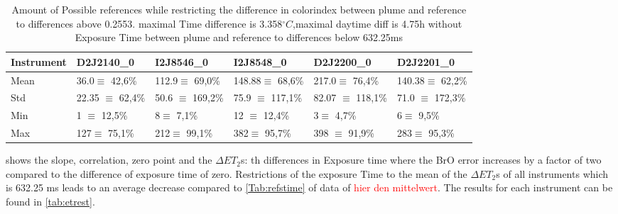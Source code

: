 \begin{table}
	\begin{tabular}{|p{2cm}|p{2cm}|p{2cm}|p{2cm}|p{2cm}|p{2cm}|}
		Instrument	&D2J2140\_0&I2J8546\_0& I2J8548\_0&D2J2200\_0&D2J2201\_0\\
		\toprule
		Mean&
		36.0$\equiv$ 42,6\%&	112.9$\equiv$ 69,0\%&
		148.88$\equiv$ 68,6\%&	217.0$\equiv$ 76,4\%&	140.38$\equiv$ 62,2\%\\
		\midrule
		Std&
		22.35 $\equiv$	62,4\%&
		50.6 $\equiv$	169,2\% &
		75.9 $\equiv$	117,1\%&
		82.07 $\equiv$	118,1\% &
		71.0 $\equiv$	172,3\% \\
		\midrule
		Min&
		1 $\equiv$	    12,5\%  &
		8$\equiv$	7,1\%  &
		12 $\equiv$	12,4\%  &
		3$\equiv$	4,7\%   &
		6$\equiv$	9,5\%  \\
		\midrule
		Max
		&127$\equiv$	75,1\%
		&212$\equiv$	99,1\%
		&382$\equiv$	95,7\%
		&398 $\equiv$	91,9\%
		&283$\equiv$	95,3\%\\
		\bottomrule
	\end{tabular}
	\caption{Amount of Possible references while restricting the difference in colorindex  between plume and reference to differences above 0.2553. maximal Time difference is 3.358$^{\circ}C$,maximal daytime diff is 4.75h without Exposure Time  between plume and reference to differences below 632.25ms}
\end{table}	

 shows the slope, correlation, zero point and the $\Delta ET_{2}$s: th differences in Exposure time where the BrO error increases by a factor of two compared to the difference of exposure time of zero.
Restrictions of the exposure Time to the mean of the $\Delta ET_{2}$s of all instruments which is 632.25 ms leads to an average decrease compared to \cref{Tab:refstime} of data of \textcolor{red}{ hier den mittelwert}. The results for each instrument can be found in \cref{tab:etrest}.


